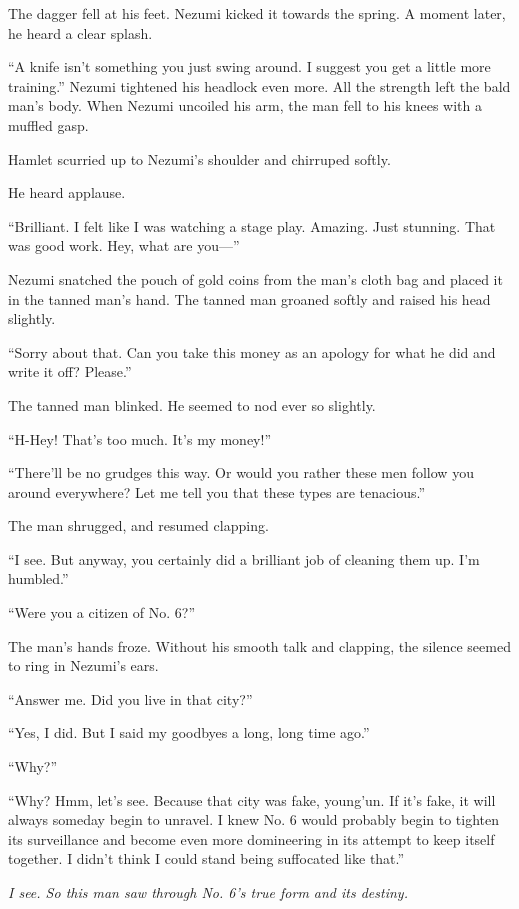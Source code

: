 The dagger fell at his feet. Nezumi kicked it towards the spring. A
moment later, he heard a clear splash.

``A knife isn't something you just swing around. I suggest you get a
little more training.'' Nezumi tightened his headlock even more. All the
strength left the bald man's body. When Nezumi uncoiled his arm, the man
fell to his knees with a muffled gasp.

Hamlet scurried up to Nezumi's shoulder and chirruped softly.

He heard applause.

``Brilliant. I felt like I was watching a stage play. Amazing. Just
stunning. That was good work. Hey, what are you---''

Nezumi snatched the pouch of gold coins from the man's cloth bag and
placed it in the tanned man's hand. The tanned man groaned softly and
raised his head slightly.

``Sorry about that. Can you take this money as an apology for what he
did and write it off? Please.''

The tanned man blinked. He seemed to nod ever so slightly.

``H-Hey! That's too much. It's my money!''

``There'll be no grudges this way. Or would you rather these men follow
you around everywhere? Let me tell you that these types are tenacious.''

The man shrugged, and resumed clapping.

``I see. But anyway, you certainly did a brilliant job of cleaning them
up. I'm humbled.''

``Were you a citizen of No. 6?''

The man's hands froze. Without his smooth talk and clapping, the silence
seemed to ring in Nezumi's ears.

``Answer me. Did you live in that city?''

``\el Yes, I did. But I said my goodbyes a long, long time ago.''

``Why?''

``Why? Hmm, let's see. Because that city was fake, young'un. If it's
fake, it will always someday begin to unravel. I knew No. 6 would
probably begin to tighten its surveillance and become even more
domineering in its attempt to keep itself together. I didn't think I
could stand being suffocated like that.''

\emph{I see. So this man saw through No. 6's true form and its destiny.}

